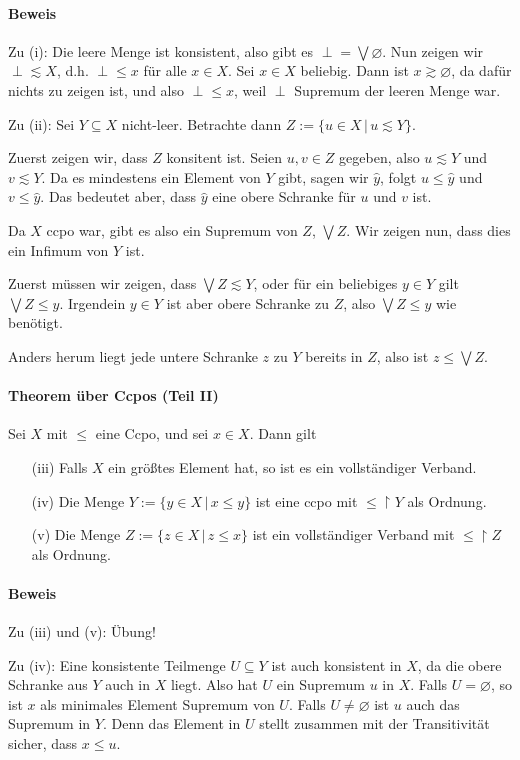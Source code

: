 \documentclass[a4paper,11pt,abstracton]{scrartcl}
\begin{document}
\paragraph{Beweis} Zu (i): Die leere Menge ist konsistent, also gibt es $\perp = \bigvee \varnothing$. Nun zeigen wir $\perp \lesssim X$, d.h. $\perp \leq x$ für alle $x \in X$. Sei $x \in X$ beliebig. Dann ist $x \gtrsim \varnothing$, da dafür nichts zu zeigen ist, und also $\perp \leq x$, weil $\perp$ Supremum der leeren Menge war.

Zu (ii): Sei $Y \subseteq X$ nicht-leer. Betrachte dann $Z := \{ u \in X \, | \, u \lesssim Y\}$.

Zuerst zeigen wir, dass $Z$ konsitent ist. Seien $u,v\in Z$ gegeben, also $u \lesssim Y$ und $v \lesssim Y$. Da es mindestens ein Element von $Y$ gibt, sagen wir $\hat y$, folgt $u \leq \hat y$ und $v \leq \hat y$. Das bedeutet aber, dass $\hat y$ eine obere Schranke für $u$ und $v$ ist.

Da $X$ ccpo war, gibt es also ein Supremum von $Z$, $\bigvee Z$. Wir zeigen nun, dass dies ein Infimum von $Y$ ist.

Zuerst müssen wir zeigen, dass $\bigvee Z \lesssim Y$, oder für ein beliebiges $y \in Y$ gilt $\bigvee Z \leq y$. Irgendein $y \in Y$ ist aber obere Schranke zu $Z$, also $\bigvee Z \leq y$ wie benötigt.

Anders herum liegt jede untere Schranke $z$ zu $Y$ bereits in $Z$, also ist $z \leq \bigvee Z$.
\paragraph{Theorem über Ccpos (Teil II)} Sei $X$ mit $\leq$ eine Ccpo, und sei $x \in X$. Dann gilt
\begin{enumerate}
 \item[(iii)] Falls $X$ ein größtes Element hat, so ist es ein vollständiger Verband.
 \item[(iv)] Die Menge $Y := \{ y \in X \, | \, x \leq y\}$ ist eine ccpo mit $\leq \upharpoonright Y$ als Ordnung.
 \item[(v)] Die Menge $Z := \{ z \in X \, | \, z \leq x\}$ ist ein vollständiger Verband mit $\leq \upharpoonright Z$ als Ordnung.
\end{enumerate}
\paragraph{Beweis} Zu (iii) und (v): Übung!

Zu (iv): Eine konsistente Teilmenge $U \subseteq Y$ ist auch konsistent in $X$, da die obere Schranke aus $Y$ auch in $X$ liegt. Also hat $U$ ein Supremum $u$ in $X$. Falls $U = \varnothing$, so ist $x$ als minimales Element Supremum von $U$. Falls $U \neq \varnothing$ ist $u$ auch das Supremum in $Y$. Denn das Element in $U$ stellt zusammen mit der Transitivität sicher, dass $x \leq u$.
\end{document}
